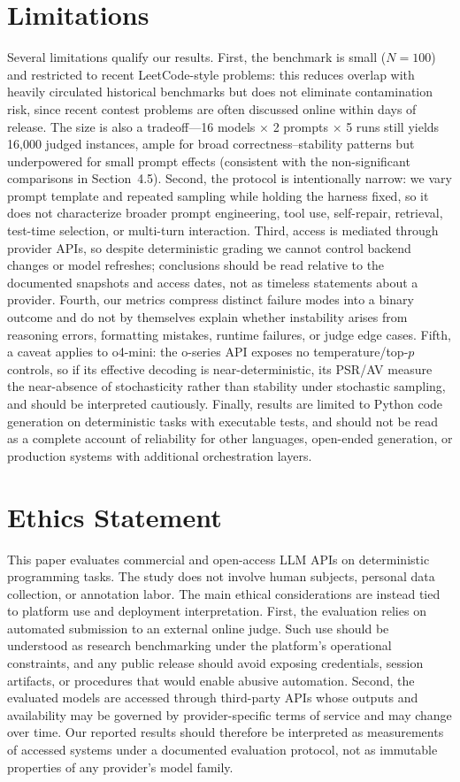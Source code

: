 \documentclass{article}
\begin{document}
\section*{Limitations}

Several limitations qualify our results. First, the benchmark is small ($N=100$) and restricted to recent LeetCode-style problems: this reduces overlap with heavily circulated historical benchmarks but does not eliminate contamination risk, since recent contest problems are often discussed online within days of release. The size is also a tradeoff---16 models $\times$ 2 prompts $\times$ 5 runs still yields 16{,}000 judged instances, ample for broad correctness--stability patterns but underpowered for small prompt effects (consistent with the non-significant comparisons in Section~4.5). Second, the protocol is intentionally narrow: we vary prompt template and repeated sampling while holding the harness fixed, so it does not characterize broader prompt engineering, tool use, self-repair, retrieval, test-time selection, or multi-turn interaction. Third, access is mediated through provider APIs, so despite deterministic grading we cannot control backend changes or model refreshes; conclusions should be read relative to the documented snapshots and access dates, not as timeless statements about a provider. Fourth, our metrics compress distinct failure modes into a binary outcome and do not by themselves explain whether instability arises from reasoning errors, formatting mistakes, runtime failures, or judge edge cases. Fifth, a caveat applies to o4-mini: the o-series API exposes no temperature/top-$p$ controls, so if its effective decoding is near-deterministic, its PSR/AV measure the near-absence of stochasticity rather than stability under stochastic sampling, and should be interpreted cautiously. Finally, results are limited to Python code generation on deterministic tasks with executable tests, and should not be read as a complete account of reliability for other languages, open-ended generation, or production systems with additional orchestration layers.

\section*{Ethics Statement}

This paper evaluates commercial and open-access LLM APIs on deterministic programming tasks. The study does not involve human subjects, personal data collection, or annotation labor. The main ethical considerations are instead tied to platform use and deployment interpretation. First, the evaluation relies on automated submission to an external online judge. Such use should be understood as research benchmarking under the platform's operational constraints, and any public release should avoid exposing credentials, session artifacts, or procedures that would enable abusive automation. Second, the evaluated models are accessed through third-party APIs whose outputs and availability may be governed by provider-specific terms of service and may change over time. Our reported results should therefore be interpreted as measurements of accessed systems under a documented evaluation protocol, not as immutable properties of any provider's model family.
\end{document}
